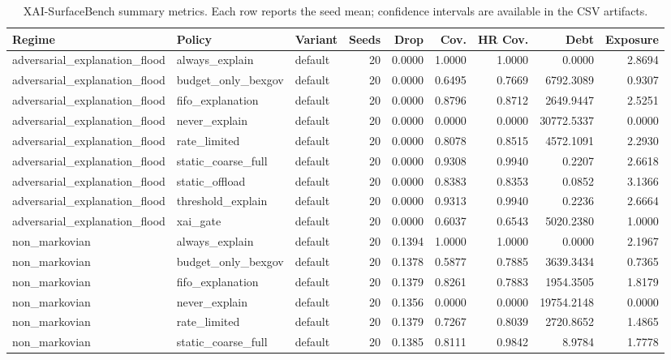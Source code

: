 \begin{table}[t]
\centering
\scriptsize
\caption{XAI-SurfaceBench summary metrics. Each row reports the seed mean; confidence intervals are available in the CSV artifacts.}
\begin{tabular}{lllrrrrrr}
\toprule
Regime & Policy & Variant & Seeds & Drop & Cov. & HR Cov. & Debt & Exposure \\
\midrule
adversarial\_explanation\_flood & always\_explain & default & 20 & 0.0000 & 1.0000 & 1.0000 & 0.0000 & 2.8694 \\
adversarial\_explanation\_flood & budget\_only\_bexgov & default & 20 & 0.0000 & 0.6495 & 0.7669 & 6792.3089 & 0.9307 \\
adversarial\_explanation\_flood & fifo\_explanation & default & 20 & 0.0000 & 0.8796 & 0.8712 & 2649.9447 & 2.5251 \\
adversarial\_explanation\_flood & never\_explain & default & 20 & 0.0000 & 0.0000 & 0.0000 & 30772.5337 & 0.0000 \\
adversarial\_explanation\_flood & rate\_limited & default & 20 & 0.0000 & 0.8078 & 0.8515 & 4572.1091 & 2.2930 \\
adversarial\_explanation\_flood & static\_coarse\_full & default & 20 & 0.0000 & 0.9308 & 0.9940 & 0.2207 & 2.6618 \\
adversarial\_explanation\_flood & static\_offload & default & 20 & 0.0000 & 0.8383 & 0.8353 & 0.0852 & 3.1366 \\
adversarial\_explanation\_flood & threshold\_explain & default & 20 & 0.0000 & 0.9313 & 0.9940 & 0.2236 & 2.6664 \\
adversarial\_explanation\_flood & xai\_gate & default & 20 & 0.0000 & 0.6037 & 0.6543 & 5020.2380 & 1.0000 \\
non\_markovian & always\_explain & default & 20 & 0.1394 & 1.0000 & 1.0000 & 0.0000 & 2.1967 \\
non\_markovian & budget\_only\_bexgov & default & 20 & 0.1378 & 0.5877 & 0.7885 & 3639.3434 & 0.7365 \\
non\_markovian & fifo\_explanation & default & 20 & 0.1379 & 0.8261 & 0.7883 & 1954.3505 & 1.8179 \\
non\_markovian & never\_explain & default & 20 & 0.1356 & 0.0000 & 0.0000 & 19754.2148 & 0.0000 \\
non\_markovian & rate\_limited & default & 20 & 0.1379 & 0.7267 & 0.8039 & 2720.8652 & 1.4865 \\
non\_markovian & static\_coarse\_full & default & 20 & 0.1385 & 0.8111 & 0.9842 & 8.9784 & 1.7778 \\

\end{tabular}
\end{table}
